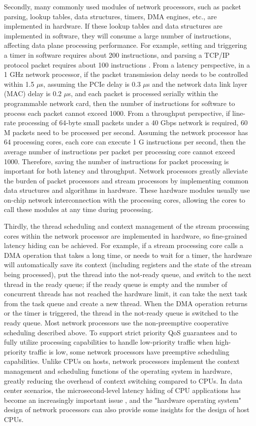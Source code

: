 Secondly, many commonly used modules of network processors, such as packet parsing, lookup tables, data structures, timers, DMA engines, etc., are implemented in hardware. If these lookup tables and data structures are implemented in software, they will consume a large number of instructions, affecting data plane processing performance. For example, setting and triggering a timer in software requires about 200 instructions, and parsing a TCP/IP protocol packet requires about 100 instructions \cite{clark1989analysis}. From a latency perspective, in a 1 GHz network processor, if the packet transmission delay needs to be controlled within 1.5 $\mu$s, assuming the PCIe delay is 0.3 $\mu$s and the network data link layer (MAC) delay is 0.2 $\mu$s, and each packet is processed serially within the programmable network card, then the number of instructions for software to process each packet cannot exceed 1000. From a throughput perspective, if line-rate processing of 64-byte small packets under a 40 Gbps network is required, 60 M packets need to be processed per second. Assuming the network processor has 64 processing cores, each core can execute 1 G instructions per second, then the average number of instructions per packet per processing core cannot exceed 1000. Therefore, saving the number of instructions for packet processing is important for both latency and throughput. Network processors greatly alleviate the burden of packet processors and stream processors by implementing common data structures and algorithms in hardware. These hardware modules usually use on-chip network interconnection with the processing cores, allowing the cores to call these modules at any time during processing.

Thirdly, the thread scheduling and context management of the stream processing cores within the network processor are implemented in hardware, so fine-grained latency hiding can be achieved. For example, if a stream processing core calls a DMA operation that takes a long time, or needs to wait for a timer, the hardware will automatically save its context (including registers and the state of the stream being processed), put the thread into the not-ready queue, and switch to the next thread in the ready queue; if the ready queue is empty and the number of concurrent threads has not reached the hardware limit, it can take the next task from the task queue and create a new thread. When the DMA operation returns or the timer is triggered, the thread in the not-ready queue is switched to the ready queue. Most network processors use the non-preemptive cooperative scheduling described above. To support strict priority QoS guarantees and to fully utilize processing capabilities to handle low-priority traffic when high-priority traffic is low, some network processors have preemptive scheduling capabilities. Unlike CPUs on hosts, network processors implement the context management and scheduling functions of the operating system in hardware, greatly reducing the overhead of context switching compared to CPUs. In data center scenarios, the microsecond-level latency hiding of CPU applications has become an increasingly important issue \cite{barroso2017attack}, and the "hardware operating system" design of network processors can also provide some insights for the design of host CPUs.

